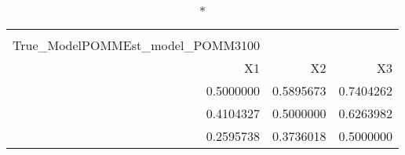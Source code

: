 \begin{longtable}{rrr}
\caption*{
{\large Pestmatrix} \\ 
{\small True\_ModelPOMMEst\_model\_POMM3100}
} \\ 
\toprule
X1 & X2 & X3 \\ 
\midrule
0.5000000 & 0.5895673 & 0.7404262 \\ 
0.4104327 & 0.5000000 & 0.6263982 \\ 
0.2595738 & 0.3736018 & 0.5000000 \\ 
\bottomrule
\end{longtable}

